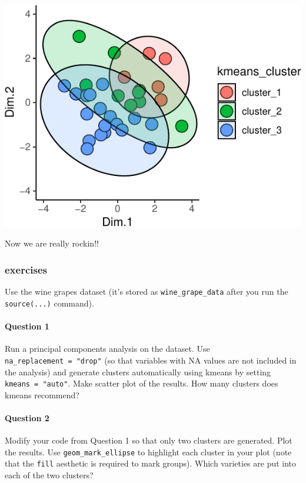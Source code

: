 \documentclass[
]{krantz}
\begin{document}
\begin{center}\includegraphics[width=0.8\linewidth]{index_files/figure-latex/unnamed-chunk-110-1} \end{center}

Now we are really rockin!!

\hypertarget{exercises-5}{%
\subsubsection{exercises}\label{exercises-5}}

Use the wine grapes dataset (it's stored as \texttt{wine\_grape\_data} after you run the \texttt{source(...)} command).

\hypertarget{question-1}{%
\paragraph{Question 1}\label{question-1}}

Run a principal components analysis on the dataset. Use \texttt{na\_replacement\ =\ "drop"} (so that variables with NA values are not included in the analysis) and generate clusters automatically using kmeans by setting \texttt{kmeans\ =\ "auto"}. Make scatter plot of the results. How many clusters does kmeans recommend?

\hypertarget{question-2}{%
\paragraph{Question 2}\label{question-2}}

Modify your code from Question 1 so that only two clusters are generated. Plot the results. Use \texttt{geom\_mark\_ellipse} to highlight each cluster in your plot (note that the \texttt{fill} aesthetic is required to mark groups). Which varieties are put into each of the two clusters?
\end{document}
